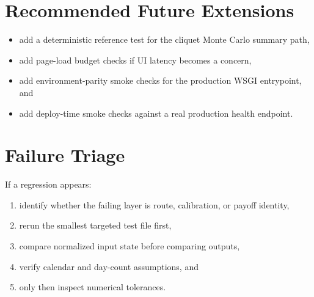 \documentclass[conference]{IEEEtran}
\begin{document}
\section{Recommended Future Extensions}
\begin{itemize}[leftmargin=1.5em]
    \item add a deterministic reference test for the cliquet Monte Carlo summary path,
    \item add page-load budget checks if UI latency becomes a concern,
    \item add environment-parity smoke checks for the production WSGI entrypoint, and
    \item add deploy-time smoke checks against a real production health endpoint.
\end{itemize}

\section{Failure Triage}
If a regression appears:
\begin{enumerate}[leftmargin=1.5em]
    \item identify whether the failing layer is route, calibration, or payoff identity,
    \item rerun the smallest targeted test file first,
    \item compare normalized input state before comparing outputs,
    \item verify calendar and day-count assumptions, and
    \item only then inspect numerical tolerances.
\end{enumerate}
\end{document}
